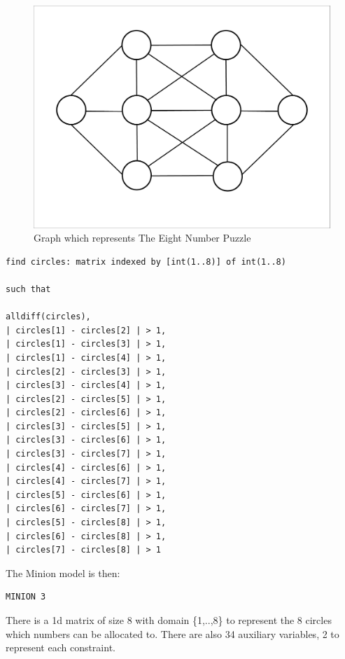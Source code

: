 \documentclass[oneside]{book}
\begin{document}
\begin{figure}[htp]
\centering
\includegraphics[scale=0.25] {EightPuzzleDiagram.pdf} 
\caption{Graph which represents The Eight Number Puzzle}
\label{fig:8puzzle}
\end{figure}

\begin{verbatim}
find circles: matrix indexed by [int(1..8)] of int(1..8)

such that

alldiff(circles),
| circles[1] - circles[2] | > 1,
| circles[1] - circles[3] | > 1,
| circles[1] - circles[4] | > 1,
| circles[2] - circles[3] | > 1,
| circles[3] - circles[4] | > 1,
| circles[2] - circles[5] | > 1,
| circles[2] - circles[6] | > 1,
| circles[3] - circles[5] | > 1,
| circles[3] - circles[6] | > 1,
| circles[3] - circles[7] | > 1,
| circles[4] - circles[6] | > 1,
| circles[4] - circles[7] | > 1,
| circles[5] - circles[6] | > 1,
| circles[6] - circles[7] | > 1,
| circles[5] - circles[8] | > 1,
| circles[6] - circles[8] | > 1,
| circles[7] - circles[8] | > 1
\end{verbatim}

The Minion model is then:

\begin{verbatim}
MINION 3
\end{verbatim}

There is a 1d matrix of size 8 with domain \{1,..,8\} to represent the 8 circles which numbers can be allocated to.  There are also 34 auxiliary variables, 2 to represent each constraint.
\end{document}
